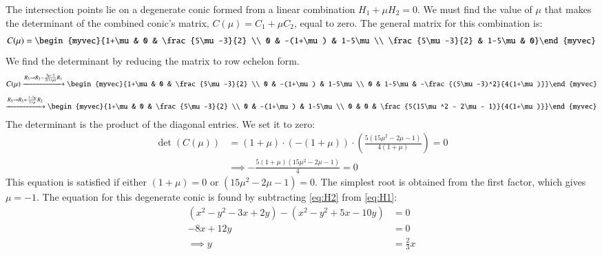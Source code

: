 \documentclass[journal]{IEEEtran}
\begin{document}
	The intersection points lie on a degenerate conic formed from a linear combination $H_1 + \mu H_2 = 0$. We must find the value of $\mu$ that makes the determinant of the combined conic's matrix, $C(\mu) = C_1 + \mu C_2$, equal to zero.
	The general matrix for this combination is:
	\begin{align}
		C(\mu) = \begin{myvec}{1+\mu & 0 & \frac{5\mu-3}{2} \\ 0 & -(1+\mu) & 1-5\mu \\ \frac{5\mu-3}{2} & 1-5\mu & 0}\end{myvec}
	\end{align}
	We find the determinant by reducing the matrix to row echelon form.
	\begin{align}
		C(\mu) \xrightarrow{R_3 \to R_3 - \frac{5\mu-3}{2(1+\mu)}R_1} \begin{myvec}{1+\mu & 0 & \frac{5\mu-3}{2} \\ 0 & -(1+\mu) & 1-5\mu \\ 0 & 1-5\mu & -\frac{(5\mu-3)^2}{4(1+\mu)}}\end{myvec}
	\end{align}
	\begin{align}
		\xrightarrow{R_3 \to R_3 + \frac{1-5\mu}{1+\mu}R_2} \begin{myvec}{1+\mu & 0 & \frac{5\mu-3}{2} \\ 0 & -(1+\mu) & 1-5\mu \\ 0 & 0 & \frac{5(15\mu^2 - 2\mu - 1)}{4(1+\mu)}}\end{myvec}
	\end{align}
	The determinant is the product of the diagonal entries. We set it to zero:
	\begin{align}
		\det(C(\mu)) &= (1+\mu) \cdot \left(-(1+\mu)\right) \cdot \left(\frac{5(15\mu^2 - 2\mu - 1)}{4(1+\mu)}\right) = 0 \nonumber \\
		&\implies -\frac{5(1+\mu)(15\mu^2 - 2\mu - 1)}{4} = 0
	\end{align}
	This equation is satisfied if either $(1+\mu) = 0$ or $(15\mu^2 - 2\mu - 1) = 0$. The simplest root is obtained from the first factor, which gives $\mu = -1$.
	The equation for this degenerate conic is found by subtracting \eqref{eq:H2} from \eqref{eq:H1}:
	\begin{align}
		(x^2 - y^2 - 3x + 2y) - (x^2 - y^2 + 5x - 10y) &= 0 \nonumber \\
		-8x + 12y &= 0 \nonumber \\
		\implies y &= \frac{2}{3}x \label{eq:common_chord}
	\end{align}
	
\end{document}
